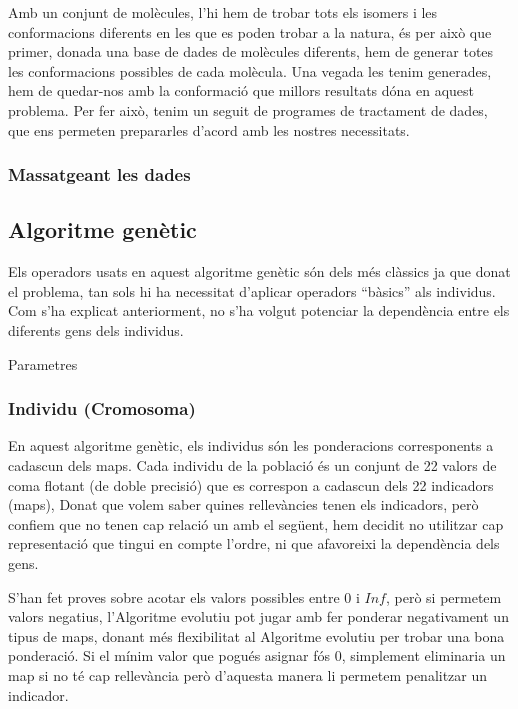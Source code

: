 \documentclass[titlepage,a4paper,12pt]{book}
\begin{document}
Amb un conjunt de molècules, l'hi hem de trobar tots els isomers i les conformacions diferents en
les que es poden trobar a la natura, és per això que primer, donada una base de dades de molècules
diferents, hem de generar totes les conformacions possibles de cada molècula.  Una vegada les tenim
generades, hem de quedar-nos amb la conformació que millors resultats dóna en aquest problema.  Per
fer això, tenim un seguit de programes de tractament de dades, que ens permeten prepararles d'acord
amb les nostres necessitats.

\subsubsection{Massatgeant les dades} %
\label{ssub:Massatgeant les dades}



\subsection{Algoritme genètic} %
\label{sub:genetic}

Els operadors usats en aquest algoritme genètic són dels més clàssics ja que
donat el problema, tan sols hi ha necessitat d'aplicar operadors ``bàsics'' als
individus.  Com s'ha explicat anteriorment, no s'ha volgut potenciar la
dependència entre els diferents gens dels individus.

Parametres

\subsubsection{Individu (Cromosoma)}
\label{ssub:individu (cromosoma)}

En aquest algoritme genètic, els individus són les ponderacions corresponents a
cadascun dels maps.  Cada individu de la població és un conjunt de 22 valors de
coma flotant (de doble precisió) que es correspon a cadascun dels 22 indicadors
(maps),  Donat que volem saber quines rellevàncies tenen els indicadors, però
confiem que no tenen cap relació un amb el següent, hem decidit no utilitzar cap
representació que tingui en compte l'ordre, ni que afavoreixi la dependència
dels gens. %

S'han fet proves sobre acotar els valors possibles entre 0 i $Inf$, però si
permetem valors negatius, l'Algoritme evolutiu pot jugar amb fer ponderar
negativament un tipus de maps, donant més flexibilitat al Algoritme evolutiu per
trobar una bona ponderació.  Si el mínim valor que pogués asignar fós 0,
simplement eliminaria un map si no té cap rellevància però d'aquesta manera li
permetem penalitzar un indicador.
\end{document}
